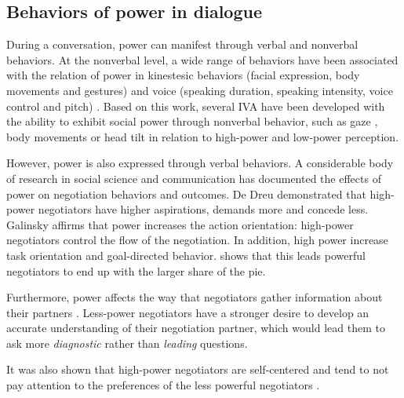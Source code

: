 \documentclass{llncs}
\begin{document}
		\subsection{Behaviors of power in dialogue}
		\label{domDialogue}
		During a conversation, power can manifest through verbal and nonverbal behaviors.	
		At the nonverbal level, a wide range of behaviors have been associated with the relation of power in kinestesic behaviors (facial expression, body movements and gestures) and voice (speaking duration, speaking intensity, voice control and pitch) \cite{burgoonnonverbal}. Based on this work, several IVA have been developed with the ability to exhibit social power through nonverbal behavior, such as gaze \cite{lance2008relation}, body movements \cite{mignault2003many} or head tilt \cite{gebhard2014exploring,callejas2014computational} in relation to high-power and low-power perception.
		
		However, power is also expressed through verbal behaviors. A considerable body of research in social science and communication has documented the effects of power on negotiation behaviors and outcomes. De Dreu demonstrated that \cite{de1995impact} high-power negotiators have higher aspirations, demands more and concede less. Galinsky \cite{galinsky2003power} affirms that power increases the action orientation: high-power negotiators control the flow of the negotiation. In addition, high power increase task orientation and goal-directed behavior. \cite{giebels2000interdependence} shows that this leads powerful negotiators to end up with the larger share of the pie.
		
		Furthermore, power affects the way that negotiators gather information about their partners \cite{de2004influence}. Less-power negotiators have a stronger desire to develop an accurate understanding of their negotiation partner, which would lead them to ask more \emph{diagnostic} rather than \emph{leading} questions.
		
		It was also shown that high-power negotiators are self-centered and tend to not pay attention to the preferences of the less powerful negotiators \cite{fiske1993controlling,de1995impact}.
		
\end{document}
